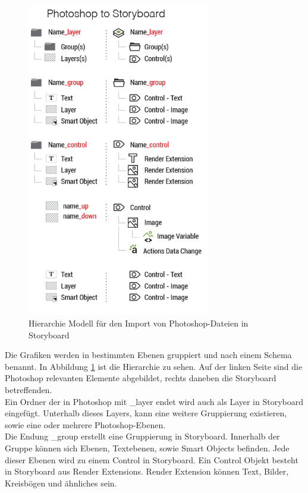 \begin{figure}[htb]
	\centering
	\includegraphics[width=8cm]{img/3_entwicklung_neues_kontept/story_psd}
	\caption[Hierarchie Modell für den Import von Photoshop-Dateien in Storyboard]{Hierarchie Modell für den Import von Photoshop-Dateien in Storyboard \cite{storyboard_doku_psd}}
	\label{fig:story_psd}
\end{figure}

Die Grafiken werden in bestimmten Ebenen gruppiert und nach einem Schema benannt. In Abbildung \ref{fig:story_psd} ist die Hierarchie zu sehen. Auf der linken Seite sind die Photoshop relevanten Elemente abgebildet, rechts daneben die Storyboard betreffenden.\\

Ein Ordner der in Photoshop mit \glqq \_layer\grqq{} endet wird auch als Layer in Storyboard eingefügt. Unterhalb dieses Layers, kann eine weitere Gruppierung existieren, sowie eine oder mehrere Photoshop-Ebenen.\\

Die Endung \glqq \_group\grqq{} erstellt eine Gruppierung in Storyboard. Innerhalb der Gruppe können sich Ebenen, Textebenen, sowie Smart Objects befinden. Jede dieser Ebenen wird zu einem Control in Storyboard. Ein Control Objekt besteht in Storyboard aus Render Extensions. Render Extension können Text, Bilder, Kreisbögen und ähnliches sein.\\

